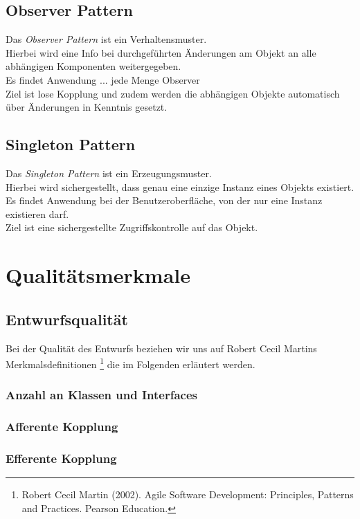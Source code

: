 \documentclass[10pt]{scrreprt}
\begin{document}
\section{Observer Pattern}
Das \textit{Observer Pattern} ist ein Verhaltensmuster. \\ Hierbei wird eine Info bei durchgeführten Änderungen am Objekt an alle abhängigen Komponenten weitergegeben. \\ Es findet Anwendung ... jede Menge Observer \\ Ziel ist lose Kopplung und zudem werden die abhängigen Objekte automatisch über Änderungen in Kenntnis gesetzt.

\section{Singleton Pattern}
Das \textit{Singleton Pattern} ist ein Erzeugungsmuster. \\ Hierbei wird sichergestellt, dass genau eine einzige Instanz eines Objekts existiert. \\ Es findet Anwendung bei der Benutzeroberfläche, von der nur eine Instanz existieren darf. \\ Ziel ist eine sichergestellte Zugriffskontrolle auf das Objekt. 




\chapter{Qualitätsmerkmale}
\section{Entwurfsqualität}
Bei der Qualität des Entwurfs beziehen wir uns auf Robert Cecil Martins Merkmalsdefinitionen \footnote{Robert Cecil Martin (2002). Agile Software Development: Principles, Patterns and Practices. Pearson Education.} die im Folgenden erläutert werden. 

\subsection*{Anzahl an Klassen und Interfaces}
\subsection*{Afferente Kopplung}
\subsection*{Efferente Kopplung}
\end{document}
